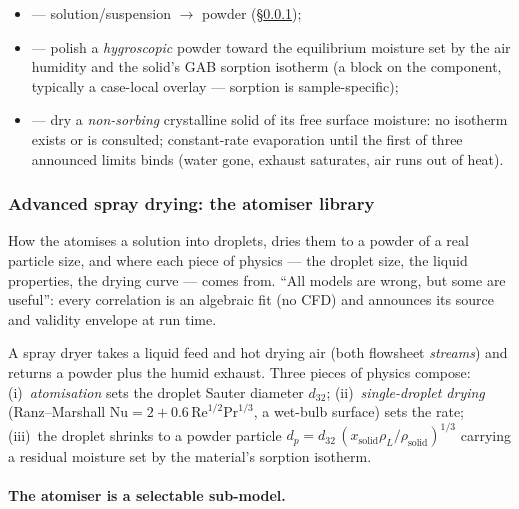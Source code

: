 \documentclass[11pt,a4paper]{article}
\begin{document}
\begin{itemize}[leftmargin=*,nosep,topsep=2pt]
\item {} --- solution/suspension $\to$ powder
      (\S\ref{sec:advanced-spray});
\item {} --- polish a \emph{hygroscopic} powder toward
      the equilibrium moisture set by the air humidity and the solid's
      GAB sorption isotherm (a  block on the
      component, typically a case-local overlay --- sorption is
      sample-specific);
\item {} --- dry a \emph{non-sorbing} crystalline
      solid of its free surface moisture: no isotherm exists or is
      consulted; constant-rate evaporation until the first of three
      announced limits binds (water gone, exhaust saturates, air runs
      out of heat).
\end{itemize}

\subsubsection{Advanced spray drying: the atomiser library}\label{sec:advanced-spray}

\begin{whatyoulllearn}
How the  atomises a solution into droplets, dries them
to a powder of a real particle size, and where each piece of physics
--- the droplet size, the liquid properties, the drying curve --- comes
from.  ``All models are wrong, but some are useful'': every correlation
is an algebraic fit (no CFD) and announces its source and validity
envelope at run time.
\end{whatyoulllearn}

A spray dryer takes a liquid feed and hot drying air (both flowsheet
\emph{streams}) and returns a powder plus the humid exhaust.  Three
pieces of physics compose: (i)~\emph{atomisation} sets the droplet
Sauter diameter $d_{32}$; (ii)~\emph{single-droplet drying}
(Ranz--Marshall
$\mathrm{Nu}=2+0.6\,\mathrm{Re}^{1/2}\mathrm{Pr}^{1/3}$, a wet-bulb
surface) sets the rate; (iii)~the droplet shrinks to a powder particle
$d_p=d_{32}\,(x_{\text{solid}}\rho_L/\rho_{\text{solid}})^{1/3}$
carrying a residual moisture set by the material's sorption isotherm.

\paragraph{The atomiser is a selectable sub-model.}
\end{document}
